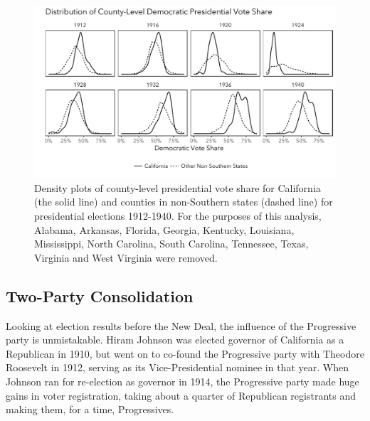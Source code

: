 \documentclass[11pt]{scrartcl}\usepackage[]{graphicx}\usepackage[]{color}
\makeatletter
\def\maxwidth{ %
  \ifdim\Gin@nat@width>\linewidth
    \linewidth
  \else
    \Gin@nat@width
  \fi
}
\newenvironment{knitrout}{}{} %
\makeatother
\begin{document}
\begin{knitrout}
\color{fgcolor}\begin{figure}

{\centering \includegraphics[width=\maxwidth]{figures/plots-countydensity-1} 

}

\caption[Density plots of county-level presidential vote share for California (the solid line) and counties in non-Southern states (dashed line) for presidential elections 1912-1940]{Density plots of county-level presidential vote share for California (the solid line) and counties in non-Southern states (dashed line) for presidential elections 1912-1940. For the purposes of this analysis, Alabama,	Arkansas,	Florida,	Georgia,	Kentucky,	Louisiana,	Mississippi,	North Carolina,	South Carolina,	Tennessee,	Texas,	Virginia and	West Virginia were removed.}\label{fig:countydensity}
\end{figure}


\end{knitrout}



\subsection*{Two-Party Consolidation}

Looking at election results before the New Deal, the influence of the Progressive party is unmistakable. Hiram Johnson was elected governor of California as a Republican in 1910, but went on to co-found the Progressive party with Theodore Roosevelt in 1912, serving as its Vice-Presidential nominee in that year.  When Johnson ran for re-election as governor in 1914, the Progressive party made huge gains in voter registration, taking about a quarter of Republican registrants and making them, for a time, Progressives.
\end{document}
